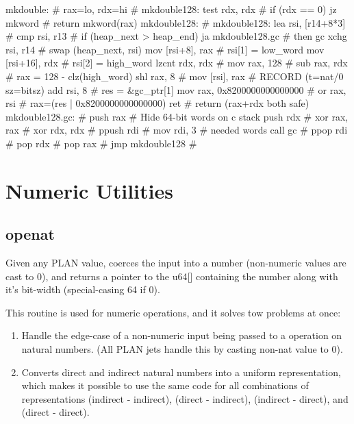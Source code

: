 \begin{asm}
mkdouble: # rax=lo, rdx=hi                  # mkdouble128:
	test	rdx, rdx                    #   if (rdx == 0)
	jz	mkword                      #     return mkword(rax)
mkdouble128:                                # mkdouble128:
	lea	rsi, [r14+8*3]              #
	cmp	rsi, r13                    #   if (heap_next > heap_end)
	ja	mkdouble128.gc              #     then gc
	xchg	rsi, r14                    #   swap (heap_next, rsi)
	mov	[rsi+8], rax                #   rsi[1] = low_word
	mov	[rsi+16], rdx               #   rsi[2] = high_word
	lzcnt	rdx, rdx                    #
	mov	rax, 128                    #
	sub	rax, rdx                    #   rax = 128 - clz(high_word)
	shl	rax, 8                      #
	mov	[rsi], rax                  #   RECORD (t=nat/0 sz=bitsz)
	add	rsi, 8                      #   res = &gc_ptr[1]
	mov	rax, 0x8200000000000000     #
	or	rax, rsi                    #   rax=(res | 0x8200000000000000)
	ret                                 #   return (rax+rdx both safe)
mkdouble128.gc:                             #
	push	rax                         #   Hide 64-bit words on c stack
	push	rdx                         #
	xor	rax, rax                    #
	xor	rdx, rdx                    #
	ppush	rdi                         #
	mov	rdi, 3                      #   needed words
	call	gc                          #
	ppop	rdi                         #
	pop	rdx                         #
	pop	rax                         #
	jmp	mkdouble128                 #
\end{asm}

\section{Numeric Utilities}

\subsection{openat}

Given any PLAN value, coerces the input into a number (non-numeric values are
cast to 0), and returns a pointer to the u64[] containing the number along with
it's bit-width (special-casing 64 if 0).

This routine is used for numeric operations, and it solves tow problems at
once:

\begin{enumerate}
\item
Handle the edge-case of a non-numeric input being passed to a operation on
natural numbers. (All PLAN jets handle this by casting non-nat value to 0).
\item
Converts direct and indirect natural numbers into a uniform representation,
which makes it possible to use the same code for all combinations of
representations (indirect - indirect), (direct - indirect), (indirect -
direct), and (direct - direct).
\end{enumerate}

